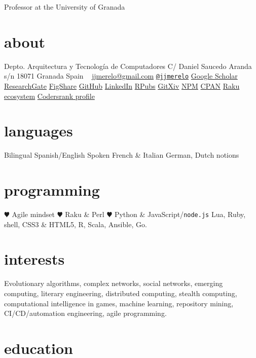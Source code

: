 \documentclass[]{friggeri-jj-cv}
\begin{document}
       {Professor at the University of Granada}

\begin{aside}
  \section{about}
    Depto. Arquitectura y Tecnología de Computadores
    C/ Daniel Saucedo Aranda s/n
    18071 Granada
    Spain
    ~
    \href{mailto:jjmerelo@gmail.com}{jjmerelo@gmail.com}
    \href{http://twitter.com/jjmerelo}{{\tt @jjmerelo}}
    \href{http://scholar.google.com/citations?user=gFxqc64AAAAJ}{Google Scholar}
    \href{https://www.researchgate.net/profile/JJ_Merelo}{ResearchGate}
    \href{https://figshare.com/authors/Juan_J_Merelo/541327}{FigShare}
   \href{https://github.com/JJ}{GitHub}
   \href{http://lnkd.in/dBVqYPa}{LinkedIn}
   \href{http://rpubs.com/jjmerelo/}{RPubs}
   \href{http://gitxiv.com/users/jj-merelo}{GitXiv}
   \href{https://www.npmjs.com/~jjmerelo}{NPM}
   \href{http://search.cpan.org/~jmerelo/}{CPAN}
   \href{https://modules.raku.org/search/?q=author%3A%22JMERELO%22}{Raku ecosystem}
   \href{https://profile.codersrank.io/user/jj}{Codersrank profile}
  \section{languages}
    Bilingual Spanish/English
    Spoken French \& Italian
    German, Dutch notions
  \section{programming}
  {\color{red} \large $\varheartsuit$} Agile mindset
  {\color{red} \large $\varheartsuit$} Raku \& Perl
  {\color{red} $\varheartsuit$} Python \& JavaScript/{\tt node.js}
    Lua, Ruby, shell, CSS3 \& HTML5, R, Scala, Ansible, Go.
\end{aside}

\section{interests}

Evolutionary algorithms, complex networks, social networks, emerging
computing, literary engineering, distributed computing, stealth
computing, computational intelligence in games, machine learning,
repository mining, CI/CD/automation engineering, agile programming.

\section{education}
\end{document}
